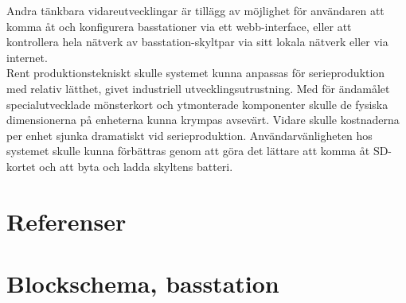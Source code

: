\documentclass[a4paper,11pt]{article}
\begin{document}
Andra tänkbara vidareutvecklingar är tillägg av möjlighet för användaren att komma åt och konfigurera basstationer via ett webb-interface, eller att kontrollera hela nätverk av basstation-skyltpar via sitt lokala nätverk eller via internet. \\

Rent produktionstekniskt skulle systemet kunna anpassas för serieproduktion med relativ lätthet, givet industriell utvecklingsutrustning. Med för ändamålet specialutvecklade mönsterkort och ytmonterade komponenter skulle de fysiska dimensionerna på enheterna kunna krympas avsevärt. Vidare skulle kostnaderna per enhet sjunka dramatiskt vid serieproduktion. Användarvänligheten hos systemet skulle kunna förbättras genom att göra det lättare att komma åt SD-kortet och att byta och ladda skyltens batteri. 

\pagebreak

\appendix
\renewcommand{\appendixpagename}{Appendix}
\appendixpage
\renewcommand{\appendixtocname}{Appendix}

\addappheadtotoc

\section{Referenser}
\pagebreak

\section{Blockschema, basstation}
\end{document}
